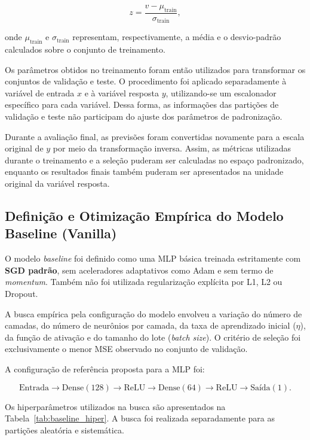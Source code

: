 \documentclass[11pt,a4paper]{article}
\begin{document}
\[
z =
\frac{v-\mu_{\mathrm{train}}}
{\sigma_{\mathrm{train}}},
\]

onde $\mu_{\mathrm{train}}$ e $\sigma_{\mathrm{train}}$ representam,
respectivamente, a média e o desvio-padrão calculados sobre o conjunto
de treinamento.

Os parâmetros obtidos no treinamento foram então utilizados para
transformar os conjuntos de validação e teste. O procedimento foi
aplicado separadamente à variável de entrada $x$ e à variável resposta
$y$, utilizando-se um escalonador específico para cada variável. Dessa
forma, as informações das partições de validação e teste não participam
do ajuste dos parâmetros de padronização.

Durante a avaliação final, as previsões foram convertidas novamente
para a escala original de $y$ por meio da transformação inversa. Assim,
as métricas utilizadas durante o treinamento e a seleção puderam ser
calculadas no espaço padronizado, enquanto os resultados finais também
puderam ser apresentados na unidade original da variável resposta.


\subsection{Definição e Otimização Empírica do Modelo Baseline (Vanilla)}

O modelo \textit{baseline} foi definido como uma MLP básica treinada
estritamente com \textbf{SGD padrão}, sem aceleradores adaptativos como
Adam e sem termo de \textit{momentum}. Também não foi utilizada
regularização explícita por L1, L2 ou Dropout.

A busca empírica pela configuração do modelo envolveu a variação do
número de camadas, do número de neurônios por camada, da taxa de
aprendizado inicial ($\eta$), da função de ativação e do tamanho do lote
(\textit{batch size}). O critério de seleção foi exclusivamente o menor
MSE observado no conjunto de validação.

A configuração de referência proposta para a MLP foi:

\[
\text{Entrada}
\rightarrow
\text{Dense}(128)
\rightarrow
\text{ReLU}
\rightarrow
\text{Dense}(64)
\rightarrow
\text{ReLU}
\rightarrow
\text{Saída}(1).
\]

Os hiperparâmetros utilizados na busca são apresentados na
Tabela~\ref{tab:baseline_hiper}. A busca foi realizada
separadamente para as partições aleatória e sistemática.
\end{document}
